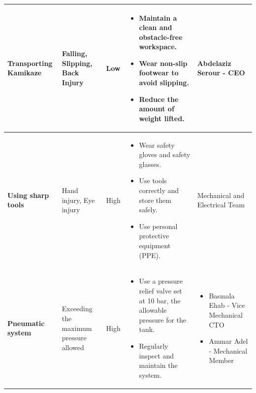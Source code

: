 \documentclass[conference , 12pt]{IEEEtran}
\begin{document}
\begin{longtable}{|p{3.5cm}|>{\raggedright}p{3.5cm}|p{1.5cm}|>{\raggedright}p{5cm}|p{3cm}|}
    \textbf{Transporting Kamikaze}                                                        & Falling, Slipping, Back Injury                                         & Low                 &
    \begin{itemize}[leftmargin=*]
        \item Maintain a clean and obstacle-free workspace.
        \item Wear non-slip footwear to avoid slipping.
        \item Reduce the amount of weight lifted.
    \end{itemize}                                   & Abdelaziz Serour - CEO                                                                                                                                                                           \\
    \hline
    \textbf{Using sharp tools}                                                            & Hand injury, Eye injury                                                & High                &
    \begin{itemize}[leftmargin=*]
        \item Wear safety gloves and safety glasses.
        \item Use tools correctly and store them safely.
        \item Use personal protective equipment (PPE).
    \end{itemize}                                      & Mechanical and Electrical Team                                                                                                                                                                \\
    \hline
    \textbf{Pneumatic system}                                                             & Exceeding the maximum pressure allowed                                 & High                &
    \begin{itemize}[leftmargin=*]
        \item Use a pressure relief valve set at 10 bar, the allowable pressure for the tank.
        \item Regularly inspect and maintain the system.
    \end{itemize} & \begin{itemize}[leftmargin=*]
                        \item Basmala Ehab - Vice Mechanical CTO
                        \item  Ammar Adel - Mechanical Member

\end{itemize}
\end{longtable}
\end{document}
